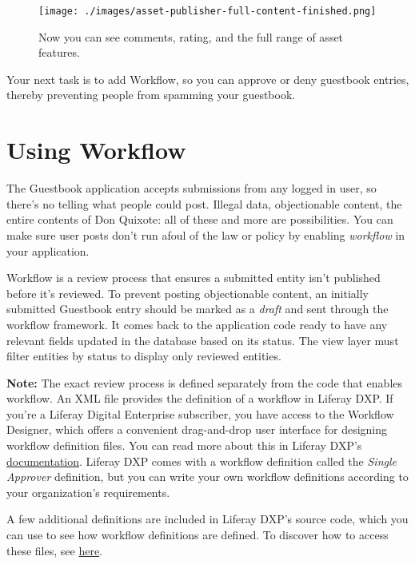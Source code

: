 \begin{figure}
\centering
\texttt{[image: ./images/asset-publisher-full-content-finished.png]}
\caption{Now you can see comments, rating, and the full range of asset
features.}
\end{figure}

Your next task is to add Workflow, so you can approve or deny guestbook
entries, thereby preventing people from spamming your guestbook.

\chapter{Using Workflow}\label{using-workflow}

The Guestbook application accepts submissions from any logged in user,
so there's no telling what people could post. Illegal data,
objectionable content, the entire contents of Don Quixote: all of these
and more are possibilities. You can make sure user posts don't run afoul
of the law or policy by enabling \emph{workflow} in your application.

Workflow is a review process that ensures a submitted entity isn't
published before it's reviewed. To prevent posting objectionable
content, an initially submitted Guestbook entry should be marked as a
\emph{draft} and sent through the workflow framework. It comes back to
the application code ready to have any relevant fields updated in the
database based on its status. The view layer must filter entities by
status to display only reviewed entities.

\noindent\hrulefill

\textbf{Note:} The exact review process is defined separately from the
code that enables workflow. An XML file provides the definition of a
workflow in Liferay DXP. If you're a Liferay Digital Enterprise
subscriber, you have access to the Workflow Designer, which offers a
convenient drag-and-drop user interface for designing workflow
definition files. You can read more about this in Liferay DXP's
\href{https://help.liferay.com/hc/en-us/articles/360028821892-Workflow-Designer}{documentation}.
Liferay DXP comes with a workflow definition called the \emph{Single
Approver} definition, but you can write your own workflow definitions
according to your organization's requirements.

A few additional definitions are included in Liferay DXP's source code,
which you can use to see how workflow definitions are defined. To
discover how to access these files, see
\href{/docs/7-2/user/-/knowledge_base/u/enabling-workflow}{here}.

